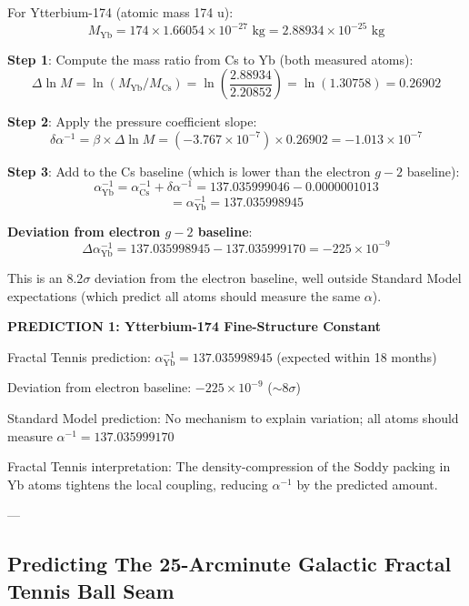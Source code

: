 \documentclass[11pt,a4paper]{article}
\begin{document}
      For Ytterbium-174 (atomic mass 174 u):
      \[
      M_\mathrm{Yb} = 174 \times 1.66054 \times 10^{-27} \text{ kg} = 2.88934 \times 10^{-25} \text{ kg}
      \]

      \noindent\textbf{Step 1}: Compute the mass ratio from Cs to Yb (both measured atoms):
      \[
      \Delta \ln M = \ln(M_\mathrm{Yb}/M_\mathrm{Cs}) = \ln\left(\frac{2.88934}{2.20852}\right) = \ln(1.30758) = 0.26902
      \]

      \noindent\textbf{Step 2}: Apply the pressure coefficient slope:
      \[
      \delta\alpha^{-1} = \beta \times \Delta\ln M = (-3.767 \times 10^{-7}) \times 0.26902 = -1.013 \times 10^{-7}
      \]

      \noindent\textbf{Step 3}: Add to the Cs baseline (which is lower than the electron $g-2$ baseline):
      \[
      \alpha^{-1}_\mathrm{Yb} = \alpha^{-1}_\mathrm{Cs} + \delta\alpha^{-1} = 137.035999046 - 0.0000001013
      \]
      \[
      = \boxed{\alpha^{-1}_\mathrm{Yb} = 137.035998945}
      \]

      \noindent\textbf{Deviation from electron $g-2$ baseline}:
      \[
      \Delta\alpha^{-1}_{\mathrm{Yb}} = 137.035998945 - 137.035999170 = -225 \times 10^{-9}
      \]

      This is an 8.2$\sigma$ deviation from the electron baseline, well outside Standard Model expectations (which predict all atoms should measure the same $\alpha$).

      \begin{mdframed}
      \centering
      \textbf{PREDICTION 1: Ytterbium-174 Fine-Structure Constant}
      \vspace{0.5em}

        Fractal Tennis prediction: $\alpha^{-1}_{\mathrm{Yb}} = 137.035998945$ (expected within 18 months)

        Deviation from electron baseline: $-225 \times 10^{-9}$ ($\sim 8\sigma$)

        Standard Model prediction: No mechanism to explain variation; all atoms should measure $\alpha^{-1} = 137.035999170$

        Fractal Tennis interpretation: The density-compression of the Soddy packing in Yb atoms tightens the local coupling, reducing $\alpha^{-1}$ by the predicted amount.
      \end{mdframed}

  ---
  \subsection{Predicting The 25-Arcminute Galactic Fractal Tennis Ball Seam}
\end{document}
